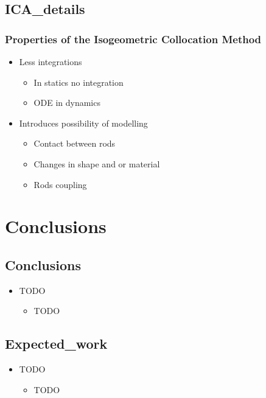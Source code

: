 \documentclass[compress]{thesisbeamer}
\begin{document}
		\subsection{ICA_details}
        \begin{frame}
        	\frametitle{Properties of the Isogeometric Collocation Method}
			\begin{itemize}%
  				\item Less integrations
  				\begin{itemize}
  					\item In statics no integration
  					\item ODE in dynamics
  				\end{itemize}
  				\item Introduces possibility of modelling
  				\begin{itemize}
  					\item Contact between rods
  					\item Changes in shape and or material 
  					\item Rods coupling
  				\end{itemize}
 			\end{itemize}
		\end{frame}

  	\section{Conclusions}
      	\subsection{Conclusions}
        \begin{frame}
        	\begin{itemize}
        		\item 	TODO
        		\begin{itemize}
        			\item TODO
        		\end{itemize}
        	\end{itemize}
        \end{frame}
        	
      	\subsection{Expected_work}
        \begin{frame}
        	\begin{itemize}
        		\item 	TODO
        		\begin{itemize}
        			\item TODO
        		\end{itemize}
        	\end{itemize}
        \end{frame}
        	
\end{document}
